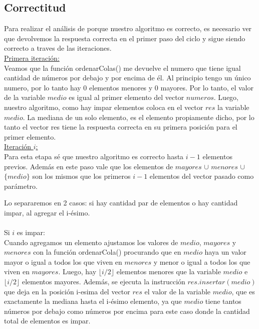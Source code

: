 \documentclass[a4paper, 10pt]{article}
\begin{document}
\subsection{Correctitud}

Para realizar el análisis de porque nuestro algoritmo es correcto, es necesario ver que devolvemos la respuesta correcta en
el primer paso del ciclo y sigue siendo correcto a traves de las iteraciones.\\

\hspace{-0,5cm} \underline{Primera iteración:}\\

Veamos que la función ordenarColas() me devuelve el numero que tiene igual cantidad de números por debajo y por encima de él. Al principio tengo un único numero, por lo tanto hay 0 elementos menores y 0 mayores. Por lo tanto, el valor de la variable $medio$ es igual al primer elemento del vector $numeros$. Luego, nuestro algoritmo, como hay impar elementos coloca en el vector $res$ la variable $medio$. La mediana de un solo elemento, es el elemento propiamente dicho, por lo tanto el vector res tiene la respuesta correcta en su primera posición para el primer elemento.\\


\hspace{-0,5cm} \underline{Iteración $i$:}\\

Para esta etapa sé que nuestro algoritmo es correcto hasta $i-1$ elementos previos.
Además en este paso vale que los elementos de $mayores$ $\cup$ $menores$ $\cup$ $\{medio\}$ son los mismos que los primeros $i-1$ elementos del vector pasado como parámetro.

Lo separaremos en 2 casos: si hay cantidad par de elementos o hay cantidad impar, al agregar el i-ésimo.\\\\
Si $i$ es impar: \\

Cuando agregamos un elemento ajustamos los valores de $medio$, $mayores$ y $menores$ con la función ordenarCola() procurando que en $medio$ haya un valor mayor o igual a todos los que viven en $menores$ y menor o igual a todos los que viven en $mayores$.
Luego, hay $\lfloor i/2\rfloor$ elementos menores que la variable $medio$ e $\lfloor i/2\rfloor$ elementos mayores.
Además, se ejecuta la instrucción $res.insertar(medio)$ que deja en la posición i-esima del vector $res$ el valor de la variable $medio$, que es exactamente la mediana hasta el i-ésimo elemento, ya que $medio$ tiene tantos números por debajo como números por encima para este caso donde la cantidad total de elementos es impar.\\\\
\end{document}
